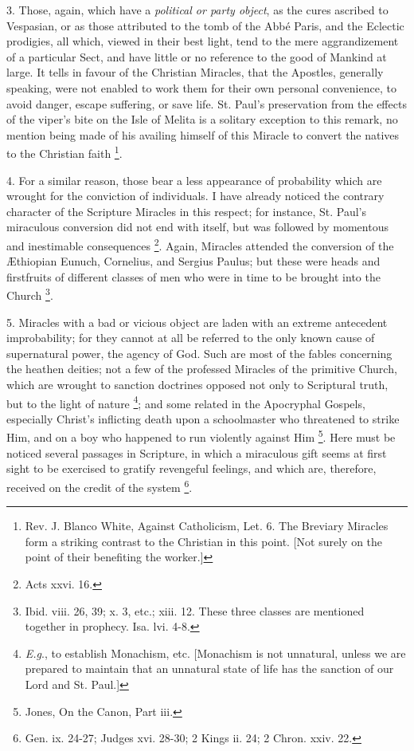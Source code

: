 3. Those, again, which have a \emph{political or
party object}, as the cures ascribed to Vespasian, or as those
attributed to the tomb of the Abbé Paris, and the Eclectic prodigies,
all which, viewed in their best light, tend to the mere aggrandizement
of a particular Sect, and have little or no reference to the good of
Mankind at large. It tells in favour of the Christian Miracles, that
the Apostles, generally speaking, were not enabled to work them for
their own personal convenience, to avoid danger, escape suffering, or
save life. St. Paul's preservation from the effects of the viper's
bite on the Isle of Melita is a solitary exception to this remark, no
mention being made of his availing himself of this Miracle to convert
the natives to the Christian faith \footnote{Rev. J. Blanco White, Against Catholicism,
Let. 6. The Breviary Miracles form a striking contrast to the
Christian in this point. [Not surely on the point of their benefiting
the worker.]}.

4. For a similar reason, those bear a less
appearance of probability which are wrought for the conviction of
individuals. I have already noticed the contrary character of the
Scripture Miracles in this respect; for instance, St. Paul's
miraculous conversion did not end with itself, but was followed by
momentous and inestimable consequences \footnote{Acts
xxvi. 16.}. Again, Miracles
attended the conversion of the Æthiopian Eunuch, Cornelius, and
Sergius Paulus; but these were heads and firstfruits of different
classes of men who were in time to be brought into the Church \footnote{Ibid. viii. 26, 39; x. 3, etc.; xiii. 12.
These three classes are mentioned together in prophecy. Isa. lvi. 4-8.}.

5. Miracles with a bad or vicious object are
laden with an extreme antecedent improbability; for they cannot at all
be referred to the only known cause of supernatural power, the agency
of God. Such are most of the fables concerning the heathen deities;
not a few of the professed Miracles of the primitive Church, which are
wrought to sanction doctrines opposed not only to Scriptural truth,
but to the light of nature \footnote{\emph{E.g}., to establish Monachism, etc. [Monachism
is not unnatural, unless we are prepared to maintain that an unnatural
state of life has the sanction of our Lord and St. Paul.]}; and some related in the
Apocryphal Gospels, especially Christ's inflicting death upon a
schoolmaster who threatened to strike Him, and on a boy who happened
to run violently against Him \footnote{Jones, On the Canon, Part iii.}. Here must be noticed several
passages in Scripture, in which a miraculous gift seems at first sight
to be exercised to gratify revengeful feelings, and which are,
therefore, received on the credit of the system \footnote{Gen. ix. 24-27; Judges xvi. 28-30; 2 Kings
ii. 24; 2 Chron. xxiv. 22.}.

